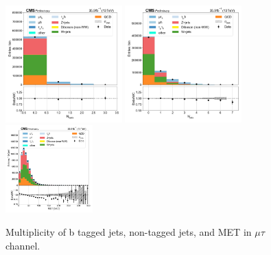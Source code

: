 \begin{figure}[htb!]
    \centering
    \includegraphics[width=0.4\textwidth]{chapters/Analysis/sectionPlots/figures/data_mc_overlays/mutau_2016_inclusive_linear_jet_n_bjets}
    \includegraphics[width=0.4\textwidth]{chapters/Analysis/sectionPlots/figures/data_mc_overlays/mutau_2016_inclusive_linear_jet_n_jets}
    \includegraphics[width=0.3\textwidth]{chapters/Analysis/sectionPlots/figures/data_mc_overlays/mutau_2016_inclusive_linear_misc_met_mag}
    \caption{Multiplicity of b tagged jets, non-tagged jets, and MET in
    $\mu\tau$ channel.}
    \label{fig:analysis:plots:mutau_jetmet}
\end{figure}


